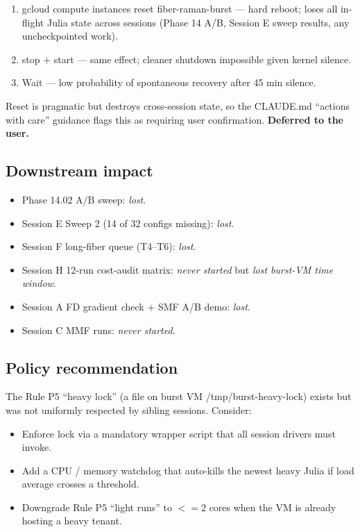 \documentclass[11pt,letterpaper]{article}
\def\leq{<=}%
\def\texttt#1{#1}%
\begin{document}
\begin{enumerate}[leftmargin=*]
  \item \texttt{gcloud compute instances reset fiber-raman-burst} --- hard reboot; loses all in-flight Julia state across sessions (Phase 14 A/B, Session E sweep results, any uncheckpointed work).
  \item \texttt{stop} $+$ \texttt{start} --- same effect; cleaner shutdown impossible given kernel silence.
  \item Wait --- low probability of spontaneous recovery after 45 min silence.
\end{enumerate}

Reset is pragmatic but destroys cross-session state, so the CLAUDE.md ``actions with care'' guidance flags this as requiring user confirmation. \textbf{Deferred to the user.}

\subsection{Downstream impact}

\begin{itemize}[leftmargin=*]
  \item Phase 14.02 A/B sweep: \emph{lost}.
  \item Session E Sweep 2 (14 of 32 configs missing): \emph{lost}.
  \item Session F long-fiber queue (T4--T6): \emph{lost}.
  \item Session H 12-run cost-audit matrix: \emph{never started} but \emph{lost burst-VM time window}.
  \item Session A FD gradient check $+$ SMF A/B demo: \emph{lost}.
  \item Session C MMF runs: \emph{never started}.
\end{itemize}

\subsection{Policy recommendation}

The Rule P5 ``heavy lock'' (a file on burst VM \texttt{/tmp/burst-heavy-lock}) exists but was not uniformly respected by sibling sessions. Consider:
\begin{itemize}[leftmargin=*]
  \item Enforce lock via a mandatory wrapper script that all session drivers must invoke.
  \item Add a CPU / memory watchdog that auto-kills the newest heavy Julia if load average crosses a threshold.
  \item Downgrade Rule P5 ``light runs'' to $\leq 2$ cores when the VM is already hosting a heavy tenant.
\end{itemize}
\end{document}
